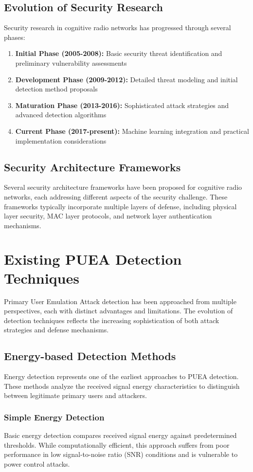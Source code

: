 \subsection{Evolution of Security Research}
Security research in cognitive radio networks has progressed through several phases:
\begin{enumerate}
\item \textbf{Initial Phase (2005-2008):} Basic security threat identification and preliminary vulnerability assessments
\item \textbf{Development Phase (2009-2012):} Detailed threat modeling and initial detection method proposals
\item \textbf{Maturation Phase (2013-2016):} Sophisticated attack strategies and advanced detection algorithms
\item \textbf{Current Phase (2017-present):} Machine learning integration and practical implementation considerations
\end{enumerate}

\subsection{Security Architecture Frameworks}
Several security architecture frameworks have been proposed for cognitive radio networks, each addressing different aspects of the security challenge. These frameworks typically incorporate multiple layers of defense, including physical layer security, MAC layer protocols, and network layer authentication mechanisms.

\section{Existing PUEA Detection Techniques}
Primary User Emulation Attack detection has been approached from multiple perspectives, each with distinct advantages and limitations. The evolution of detection techniques reflects the increasing sophistication of both attack strategies and defense mechanisms.

\subsection{Energy-based Detection Methods}
Energy detection represents one of the earliest approaches to PUEA detection. These methods analyze the received signal energy characteristics to distinguish between legitimate primary users and attackers.

\subsubsection{Simple Energy Detection}
Basic energy detection compares received signal energy against predetermined thresholds. While computationally efficient, this approach suffers from poor performance in low signal-to-noise ratio (SNR) conditions and is vulnerable to power control attacks.

